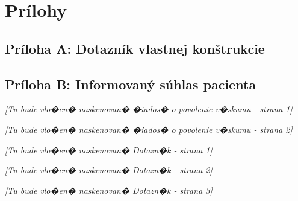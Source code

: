 
\chapter{Prílohy}

\section*{Príloha A: Dotazník vlastnej konštrukcie}


\clearpage

\section*{Príloha B: Informovaný súhlas pacienta}


\clearpage

\newpage
\null
\vfill
\begin{center}
\textit{[Tu bude vlo�en� naskenovan� �iados� o povolenie v�skumu - strana 1]}
\end{center}
\vfill
\clearpage

\newpage
\null
\vfill
\begin{center}
\textit{[Tu bude vlo�en� naskenovan� �iados� o povolenie v�skumu - strana 2]}
\end{center}
\vfill
\clearpage

\newpage
\null
\vfill
\begin{center}
\textit{[Tu bude vlo�en� naskenovan� Dotazn�k - strana 1]}
\end{center}
\vfill
\clearpage

\newpage
\null
\vfill
\begin{center}
\textit{[Tu bude vlo�en� naskenovan� Dotazn�k - strana 2]}
\end{center}
\vfill
\clearpage

\newpage
\null
\vfill
\begin{center}
\textit{[Tu bude vlo�en� naskenovan� Dotazn�k - strana 3]}
\end{center}
\vfill
\clearpage

